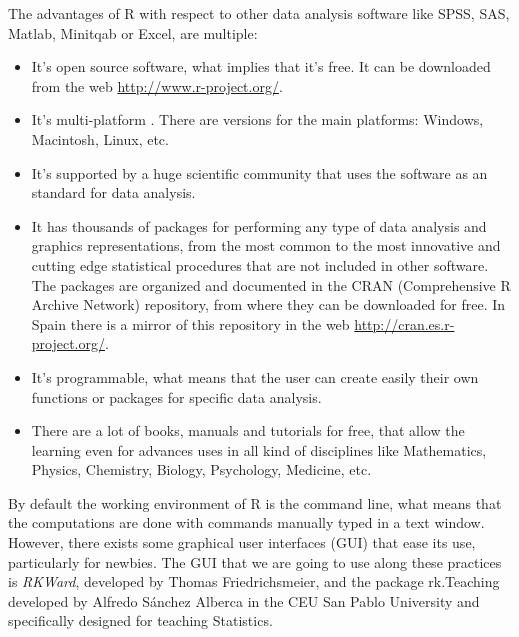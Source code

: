 The advantages of R with respect to other data analysis software like SPSS, SAS, Matlab, Minitqab or Excel, are
multiple:
\begin{itemize}
\item It's open source software, what implies that it's free. 
It can be downloaded from the web \url{http://www.r-project.org/}.
\item It's multi-platform .
There are versions for the main platforms: Windows, Macintosh, Linux, etc. 
\item It's supported by a huge scientific community that uses the software as an standard for data analysis. 
\item It has thousands of packages for performing any type of data analysis and graphics representations, from the most
common to the most innovative and cutting edge statistical procedures that are not included in other software. 
The packages are organized and documented in the CRAN (Comprehensive R Archive Network) repository, from where they
can be downloaded for free. 
In Spain there is a mirror of this repository in the web \url{http://cran.es.r-project.org/}.
\item It's programmable, what means that the user can create easily their own functions or packages for specific data
analysis.
\item There are a lot of books, manuals and tutorials for free, that allow the learning even for advances uses
in all kind of disciplines like Mathematics, Physics, Chemistry, Biology, Psychology, Medicine, etc. 
\end{itemize}

By default the working environment of R is the command line, what means that the computations are done with commands
manually typed in a text window.
However, there exists some graphical user interfaces (GUI) that ease its use, particularly for newbies.
The GUI that we are going to use along these practices is \emph{RKWard}, developed by Thomas
Friedrichsmeier, and the package rk.Teaching developed by Alfredo Sánchez Alberca in the CEU San Pablo
University and specifically designed for teaching Statistics.

